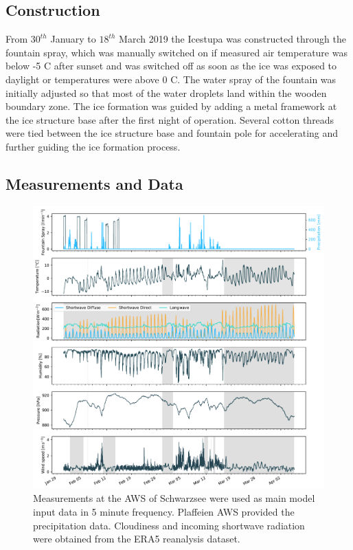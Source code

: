 \documentclass[utf8]{frontiersSCNS} %
\begin{document}
\subsection{Construction} From $30^{th}$ January to $18^{th}$ March 2019 the Icestupa was constructed through the
fountain spray, which was manually switched on if measured air temperature was below -5 \degree C after sunset and was
switched off as soon as the ice was exposed to daylight or temperatures were above 0 \degree C. The water spray of the
fountain was initially adjusted so that most of the water droplets land within the wooden boundary zone. The ice
formation was guided by adding a metal framework at the ice structure base after the first night of operation. Several
cotton threads were tied between the ice structure base and fountain pole for accelerating and further guiding the ice
formation process. 

\subsection{Measurements and Data}

\begin{figure}[htpb] \centering \includegraphics[width=\linewidth]{./Figures/Figure_3} \caption{Measurements at the AWS
of Schwarzsee were used as main model input data in 5 minute frequency. Plaffeien AWS provided the precipitation data.
Cloudiness and incoming shortwave radiation were obtained from the ERA5 reanalysis dataset.} \label{fig:input}
\end{figure}
\end{document}
